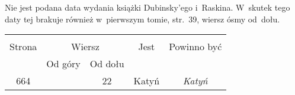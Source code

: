 \documentclass[a4paper,11pt]{article}
\begin{document}
\vspace{\spaceTwo}














\start {} Nie jest podana data wydania książki
Dubinsky'ego i~Raskina. W~skutek tego daty tej brakuje również
w~pierwszym tomie, str.~39, wiersz ósmy od~dołu.







\begin{center}

  \begin{tabular}{|c|c|c|c|c|}
    \hline
    & \multicolumn{2}{c|}{} & & \\
    Strona & \multicolumn{2}{c|}{Wiersz} & Jest
                              & Powinno być \\ \cline{2-3}
    & Od góry & Od dołu & & \\
    \hline
    664 & & 22 & Katyń & \textit{Katyń} \\
    \hline
  \end{tabular}

\end{center}
\end{document}
